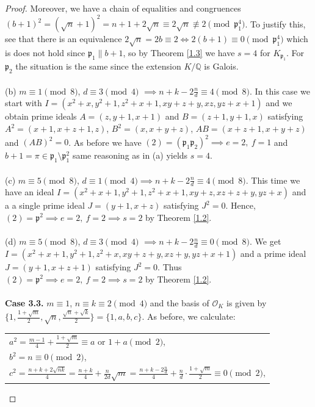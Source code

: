 \documentclass[12pt]{article}
\theoremstyle{remark}
\begin{document}
\begin{proof}
Moreover, we have a chain of equalities and congruences $(b+1)^2 = (\sqrt{n}+1)^2 = n+1+2\sqrt{n} \equiv 2\sqrt{n} \not\equiv 2 \pmod{\mathfrak{p}_1^4}$. To justify this, see that there is an equivalence $2\sqrt{n} = 2b \equiv 2 \iff 2(b+1) \equiv 0 \pmod{\mathfrak{p}_1^4}$ which is does not hold since $\mathfrak{p}_1 \parallel b+1$, so by Theorem \ref{1.3} we have $s=4$ for $K_{\mathfrak{p}_1}$. For $\mathfrak{p}_2$ the situation is the same since the extension $K/\mathbb{Q}$ is Galois.
\\ \\
(b) $m \equiv 1 \pmod{8}$, $d \equiv 3 \pmod{4}$ $ \implies n+k-2\frac{n}{d} \equiv 4 \pmod{8}$. In this case we start with
$I = (x^2+x,y^2+1,z^2+x+1,xy+z+y,xz,yz+x+1)$ and we obtain prime ideals $A=(z,y+1,x+1)$ and $B = (z+1,y+1,x)$ satisfying $A^2 = (x+1,x+z+1,z)$, $B^2=(x,x+y+z)$, $AB = (x+z+1,x+y+z)$ and $(AB)^2=0$. As before we have $(2) = (\mathfrak{p}_1\mathfrak{p}_2)^2 \implies e=2, \ f=1$ and $b+1 = \pi \in \mathfrak{p}_1\setminus\mathfrak{p}_1^2$ same reasoning as in (a) yields $s=4$.
\\ \\
(c) $m \equiv 5 \pmod{8}$, $d \equiv 1 \pmod{4} \implies n+k-2\frac{n}{d} \equiv 4 \pmod{8}$. This time we have an ideal
$I = (x^2+x+1,y^2+1,z^2+x+1,xy+z,xz+z+y,yz+x)$ and a a single prime ideal $J = (y+1,x+z)$ satisfying $J^2 = 0.$ Hence, $ (2) = \mathfrak{p}^2 \implies e=2, \ f=2 \implies s=2$ by Theorem \ref{1.2}.
\\ \\
(d) $m \equiv 5 \pmod{8}$, $d \equiv 3 \pmod{4}$ $ \implies n+k-2\frac{n}{d} \equiv 0 \pmod{8}$. We get
$I = (x^2+x+1,y^2+1,z^2+x,xy+z+y,xz+y,yz+x+1)$ and a prime ideal $J = (y+1,x+z+1)$ satisfying $J^2 = 0.$ Thus $(2) = \mathfrak{p}^2 \implies e=2,\ f=2 \implies s=2$ by Theorem \ref{1.2}.
\\ \\
\textbf{Case 3.3.}  $m \equiv 1$, $n \equiv k \equiv 2 \pmod{4}$ and the basis of $\mathcal{O}_K$ is given by $\{1, \frac{1+\sqrt{m}}{2}, \sqrt{n}, \frac{\sqrt{n}+\sqrt{k}}{2}\} = \{1,a,b,c\}$.  As before, we calculate:
\begin{center}
\begin{tabular}{@{}l@{}}
$a^2 = \frac{m-1}{4} + \frac{1+\sqrt{m}}{2} \equiv a \text{ or } 1 + a\pmod{2}$, \\
$b^2 = n \equiv 0 \pmod{2}$,\\
$c^2 = \frac{n+k+2\sqrt{nk}}{4} = \frac{n+k}{4} + \frac{n}{2d}\sqrt{m} = \frac{n+k-2\frac{n}{d}}{4} + \frac{n}{d} \cdot \frac{1+\sqrt{m}}{2} \equiv 0 \pmod{2}$,\\


\end{tabular}
\end{center}
\end{proof}
\end{document}
